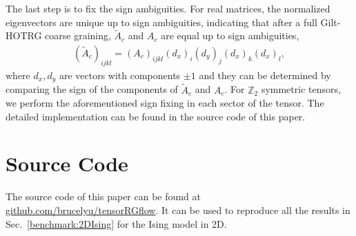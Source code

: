 \documentclass[aps,prb,reprint,superscriptaddress]{revtex4-2}
\begin{document}
The last step is to fix the sign ambiguities. For real matrices, the
normalized eigenvectors are unique up to sign ambiguities, indicating
that after a full Gilt-HOTRG coarse graining, $\tilde{A}_c$ and $A_c$
are equal up to sign ambiguities,
%
\begin{align}\label{eq:signAmbi}
    \left(\tilde{A}_c \right)_{ijkl} =
    \left(A_c\right)_{ijkl}(d_x)_i (d_y)_j (d_x)_k (d_x)_l, 
\end{align}
%
where $d_x,d_y$ are vectors with components $\pm 1$ and they can be
determined by comparing the sign of the components of $\tilde{A}_c$ and
$A_c$. For $\mathbb{Z}_2$ symmetric tensors, we perform the
aforementioned sign fixing in each sector of the tensor. The detailed
implementation can be found in the source code of this paper.
%



\section{Source Code}
The source code of this paper can be found at
\href{https://github.com/brucelyu/tensorRGflow}{github.com/brucelyu/tensorRGflow}.
It can be used to reproduce all the results in
Sec.~\ref{benchmark:2DIsing} for the Ising model in 2D.


\end{document}
